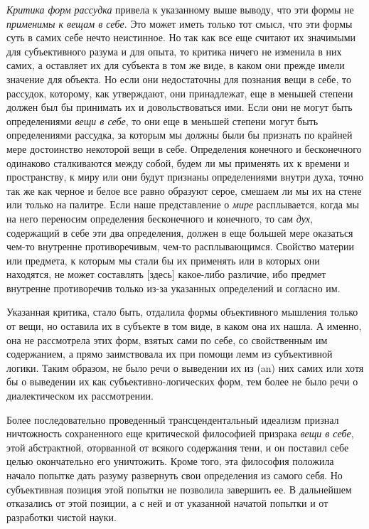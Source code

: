 \emph{Критика форм рассудка} привела к указанному выше
выводу, что эти формы не \emph{применимы к вещам в себе}.
Это может иметь только тот смысл, что эти формы суть
в самих себе нечто неистинное. Но так как все еще считают
их значимыми для субъективного разума и для
опыта, то критика ничего не изменила в них самих, а
оставляет их для субъекта в том же виде, в каком они
прежде имели значение для объекта. Но если они недостаточны
для познания вещи в себе, то рассудок, которому,
как утверждают, они принадлежат, еще в меньшей
степени должен был бы принимать их и довольствоваться
ими. Если они не могут быть определениями \emph{вещи в
себе}, то они еще в меньшей степени могут быть определениями
рассудка, за которым мы должны были бы
признать по крайней мере достоинство некоторой вещи
в себе. Определения конечного и бесконечного одинаково
сталкиваются между собой, будем ли мы применять их
к времени и пространству, к миру или они будут признаны
определениями внутри духа, точно так же как черное
и белое все равно образуют серое, смешаем ли мы их
на стене или только на палитре. Если наше представление
о \emph{мире} расплывается, когда мы на него переносим
определения бесконечного и конечного, то сам \emph{дух}, содержащий
в себе эти два определения, должен в еще большей
мере оказаться чем-то внутренне противоречивым,
чем-то расплывающимся. Свойство материи или предмета,
к которым мы стали бы их применять или в которых они
находятся, не может составлять [здесь] какое-либо различие,
ибо предмет внутренне противоречив только из-за
указанных определений и согласно им.

Указанная критика, стало быть, отдалила формы
объективного мышления только от вещи, но оставила их
в субъекте в том виде, в каком она их нашла. А именно,
она не рассмотрела этих форм, взятых сами по себе, со
свойственным им содержанием, а прямо заимствовала их
при помощи лемм из субъективной логики. Таким образом,
не было речи о выведении их из (an) них самих
или хотя бы о выведении их как субъективно-логических
форм, тем более не было речи о диалектическом их рассмотрении.

Более последовательно проведенный трансцендентальный
идеализм признал ничтожность сохраненного
еще критической философией призрака \emph{вещи в себе}, этой
абстрактной, оторванной от всякого содержания тени,
и он поставил себе целью окончательно его уничтожить\endnotemark{}.
Кроме того, эта философия положила начало попытке
дать разуму развернуть свои определения из самого себя.
Но субъективная позиция этой попытки не позволила
завершить ее. В дальнейшем отказались от этой позиции,
а с ней и от указанной начатой попытки и от разработки
чистой науки.

